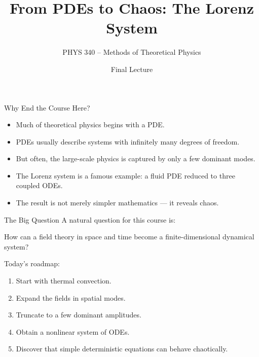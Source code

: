 \documentclass[aspectratio=169]{beamer}
\title{From PDEs to Chaos: The Lorenz System}
\author{PHYS 340 -- Methods of Theoretical Physics}
\date{Final Lecture}
\begin{document}
\frame{\titlepage}

\begin{frame}{Why End the Course Here?}
\begin{itemize}
\item Much of theoretical physics begins with a PDE.
\item PDEs usually describe systems with infinitely many degrees of freedom.
\item But often, the large-scale physics is captured by only a few dominant modes.
\item The Lorenz system is a famous example: a fluid PDE reduced to three coupled ODEs.
\item The result is not merely simpler mathematics --- it reveals chaos.
\end{itemize}
\end{frame}

\begin{frame}{The Big Question}
A natural question for this course is:

\vspace{0.5em}

\begin{center}
\Large
How can a field theory in space and time become a finite-dimensional dynamical system?
\end{center}

\vspace{0.8em}

Today's roadmap:
\begin{enumerate}
\item Start with thermal convection.
\item Expand the fields in spatial modes.
\item Truncate to a few dominant amplitudes.
\item Obtain a nonlinear system of ODEs.
\item Discover that simple deterministic equations can behave chaotically.
\end{enumerate}
\end{frame}
\end{document}
